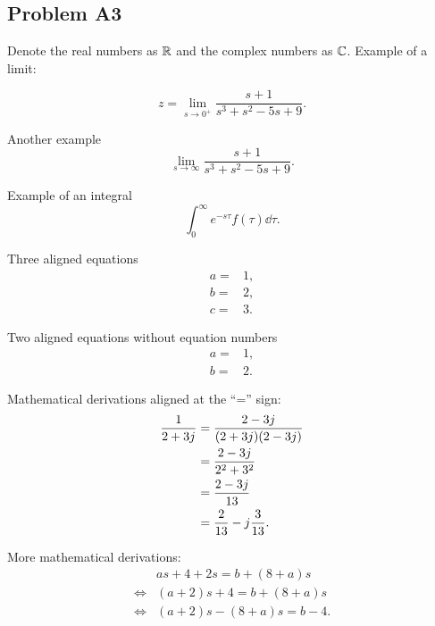 \subsection{Problem A3} Denote the real numbers as $\mathbb{R}$ and the complex numbers as $\mathbb{C}$. Example of a limit:

    \begin{equation}
        z = \lim_{s\to0^+}\frac{s+1}{s^3+s^2-5s+9}.
    \end{equation}
    
    Another example
    \begin{equation}
        \lim_{s\to\infty} \frac{s+1}{s^3+s^2-5s+9}.
    \end{equation}
    
    Example of an integral
    \begin{equation}
        \int_0^\infty e^{-s\tau}f(\tau)\dd\tau.
    \end{equation}
    
    Three aligned equations
    \begin{align}
        a =& 1,
        \\
        b =& 2,
        \\
        c =& 3.
    \end{align}
    
    Two aligned equations without equation numbers
    \begin{align*}
        a =& 1,
        \\
        b =& 2.
    \end{align*}
    
    Mathematical derivations aligned at the ``='' sign:
    \begin{align}
        \frac{1}{2+3j} {}={}& \frac{2-3j}{(2+3j)(2-3j)}
        \notag\\
        {}={}& \frac{2-3j}{2^2 + 3^2}
        \notag\\
        {}={}& \frac{2-3j}{13}
        \notag\\
        {}={}&\frac{2}{13} - j\frac{3}{13}.
    \end{align}
    
    More mathematical derivations:
    \begin{align*}
        & as + 4 + 2s = b + (8+a)s
        \\
        \Leftrightarrow{}& (a+2)s + 4 = b + (8+a)s
        \\
        \Leftrightarrow{}& (a+2)s - (8+a)s = b - 4.
    \end{align*}
    
